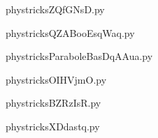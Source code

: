     \newcommand{\CaptionFigZQfGNsD}{<+Type your caption here+>}
    \begin{center}
        
    \end{center}
    phystricksZQfGNsD.py

    

    \clearpage
    


    \newcommand{\CaptionFigQZABooEsqWaq}{<+Type your caption here+>}
    \begin{center}
        
    \end{center}
    phystricksQZABooEsqWaq.py

    

    \clearpage
    


    \newcommand{\CaptionFigParaboleBasDqAAua}{<+Type your caption here+>}
    \begin{center}
        
    \end{center}
    phystricksParaboleBasDqAAua.py

    

    \clearpage
    


    \newcommand{\CaptionFigOIHVjmO}{<+Type your caption here+>}
    \begin{center}
        
    \end{center}
    phystricksOIHVjmO.py

    

    \clearpage
    


    \newcommand{\CaptionFigBZRzIsR}{<+Type your caption here+>}
    \begin{center}
        
    \end{center}
    phystricksBZRzIsR.py

    

    \clearpage
    


    \newcommand{\CaptionFigXDdastq}{<+Type your caption here+>}
    \begin{center}
        
    \end{center}
    phystricksXDdastq.py


